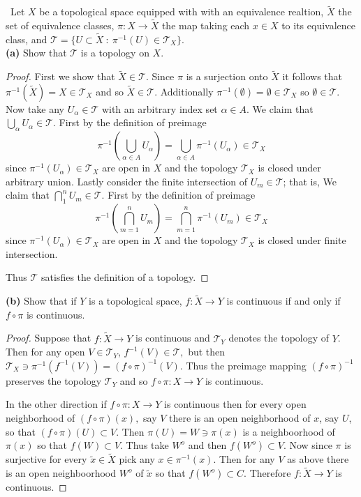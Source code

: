 \documentclass[11pt]{amsart}
\theoremstyle{definition}
\numberwithin{theorem}{section}
\numberwithin{definition}{section}
\numberwithin{equation}{section}
\def\scriptt{{\mathcal T}}
\begin{document}
\medskip {}\ Let $X$ be a topological space equipped with with an equivalence realtion, $\tilde X$ the set of equivalence classes, $\pi: X \to \tilde X$ the map taking each $x \in X$ to its equivalence class, and $\scriptt = \{U \subset \tilde X\ :\ \pi^{-1}(U) \in \scriptt_X\}$. \\
\noindent \textbf{(a)} Show that $\scriptt$ is a topology on $X$.
\begin{proof}
	First we show that $\tilde X \in \scriptt$. Since $\pi$ is a surjection onto $\tilde X$ it follows that $\pi^{-1}(\tilde X) = X \in \scriptt_X$ and so $\tilde X \in \scriptt$. Additionally $\pi^{-1}(\emptyset) = \emptyset \in \scriptt_X$ so $\emptyset \in \scriptt$. Now take any $U_\alpha \in \scriptt$ with an arbitrary index set $\alpha \in A$. We claim that $\bigcup_{\alpha} U_\alpha \in \scriptt$. First by the definition of preimage 
	\begin{equation*}
	\pi^{-1}\left(\bigcup_{\alpha \in A} U_\alpha\right) = \bigcup_{\alpha \in A} \pi^{-1}\left( U_\alpha\right) \in \scriptt_X
	\end{equation*}
	since $\pi^{-1}\left( U_\alpha\right) \in \scriptt_X$ are open in $X$ and the topology $\scriptt_X$ is closed under arbitrary union. Lastly consider the finite intersection of $U_m \in \scriptt$; that is, 
	We claim that $\bigcap_{1}^n U_m \in \scriptt$. First by the definition of preimage 
	\begin{equation*}
	\pi^{-1}\left(\bigcap_{m=1}^n U_m\right) = \bigcap_{m=1}^n  \pi^{-1}\left( U_m\right) \in \scriptt_X
	\end{equation*}
	since $\pi^{-1}\left( U_\alpha\right) \in \scriptt_X$ are open in $X$ and the topology $\scriptt_X$ is closed under finite intersection.

	Thus $\scriptt$ satisfies the definition of a topology.
\end{proof}

\noindent \textbf{(b)} Show that if $Y$ is a topological space, $f: \tilde X \to Y$ is continuous if and only if 
$f \circ \pi$ is continuous.
\begin{proof}
Suppose that $f: \tilde X \to Y$ is continuous and $\scriptt_Y$ denotes the topology of $Y$. Then for any open $V \in \scriptt_Y$, $f^{-1}(V) \in \scriptt,$ but then $\scriptt_X \ni \pi^{-1}( f^{-1}(V)) = (f\circ \pi)^{-1}(V).$ Thus the preimage mapping $(f\circ \pi)^{-1}$ preserves the topology $\scriptt_Y$ and so $f \circ \pi: X \to Y$ is continuous. 

In the other direction if $f \circ \pi: X \to Y $ is continuous then for every open neighborhood of $(f \circ \pi)(x),$ say $V$ there is an open neighborhood of $x$, say $U$, so that $(f \circ \pi)(U) \subset V.$ Then $\pi(U) = W \ni \pi(x)$ is a neighboorhood of $\pi(x)$ so that $f(W) \subset V$. Thus take $W^o$ and then $f(W^o) \subset V$. Now since $\pi$ is surjective for every $\tilde x \in \tilde X$ pick any $x \in \pi^{-1}(x)$. Then for any $V$ as above there is an open neighboorhood $W^o$  of $\tilde x$ so that $f(W^o) \subset C$. Therefore $f: \tilde X \to Y$ is continuous.
\end{proof}
\end{document}
